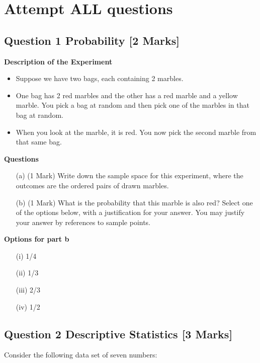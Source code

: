 \documentclass[a4paper,12pt]{article}
\begin{document}
\section*{Attempt ALL questions}

\subsection*{Question 1 Probability [2 Marks]}

\textbf{Description of the Experiment}
\begin{itemize}
\item Suppose we have two bags, each containing 2 marbles. 
\item One bag has 2 red marbles and
the other has a red marble and a yellow marble. 
You pick a bag at random and then pick
one of the marbles in that bag at random. 
\item When you look at the marble, it is red. 
You
now pick the second marble from that same bag.
\end{itemize} 
\textbf{Questions}
\begin{itemize}
\item[(a)](1 Mark)  Write down the sample space for this experiment, where the outcomes are the ordered pairs of drawn marbles.
\item[(b)](1 Mark) What is the probability that this marble
is also red? Select one of the options below, with a justification for your answer.
You may justify your answer by references to sample points.
\end{itemize}
\textbf{Options for part b}
\begin{center}
\begin{multicols}{4}
\begin{itemize}
\item[(i)] 1/4
\item[(ii)] 1/3
\item[(iii)] 2/3
\item[(iv)] 1/2
\end{itemize}
\end{multicols}
\end{center}


\bigskip
\subsection*{Question 2 Descriptive Statistics [3 Marks]}

Consider the following data set of seven numbers:
\end{document}
